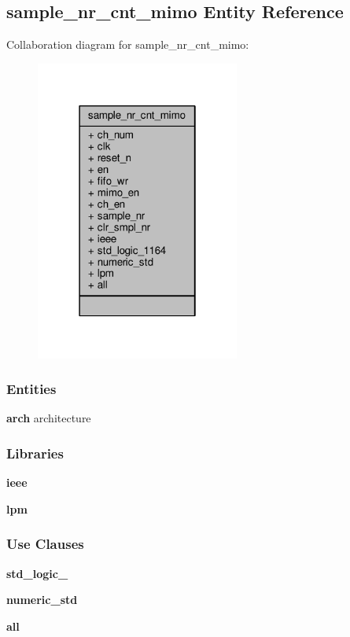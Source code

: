 \subsection{sample\+\_\+nr\+\_\+cnt\+\_\+mimo Entity Reference}
\label{classsample__nr__cnt__mimo}


Collaboration diagram for sample\+\_\+nr\+\_\+cnt\+\_\+mimo\+:\nopagebreak
\begin{figure}[H]
\begin{center}
\leavevmode
\includegraphics[width=190pt]{dd/d2f/classsample__nr__cnt__mimo__coll__graph}
\end{center}
\end{figure}
\subsubsection*{Entities}
\begin{DoxyCompactItemize}
\item 
{\bf arch} architecture
\end{DoxyCompactItemize}
\subsubsection*{Libraries}
 \begin{DoxyCompactItemize}
\item 
{\bf ieee} 
\item 
{\bf lpm} 
\end{DoxyCompactItemize}
\subsubsection*{Use Clauses}
 \begin{DoxyCompactItemize}
\item 
{\bf std\+\_\+logic\+\_}   
\item 
{\bf numeric\+\_\+std}   
\item 
{\bf  all }   
\end{DoxyCompactItemize}
